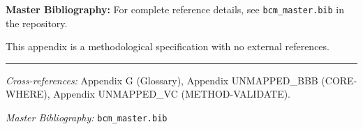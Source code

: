 \begin{tcolorbox}[colback=blue!5!white, colframe=blue!75!black]
\textbf{Master Bibliography:} For complete reference details, see
\texttt{bcm\_master.bib} in the repository.

This appendix is a methodological specification with no external references.
\end{tcolorbox}

\nocite{bcm_master}



\vspace{1em}
\hrule
\vspace{0.5em}

\noindent\textit{Cross-references:}
Appendix G (Glossary),
Appendix UNMAPPED_BBB (CORE-WHERE),
Appendix UNMAPPED_VC (METHOD-VALIDATE).

\noindent\textit{Master Bibliography:} \texttt{bcm\_master.bib}


